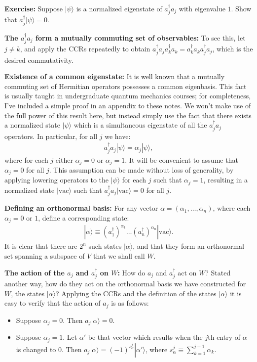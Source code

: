 \documentclass[12pt]{article}
\begin{document}
\textbf{Exercise:} Suppose $|\psi\rangle$ is a normalized eigenstate
of $a_j^\dagger a_j$ with eigenvalue $1$.  Show that $a_j^\dagger
|\psi\rangle = 0$.

\textbf{The $a_j^\dagger a_j$ form a mutually commuting set of
  observables:} To see this, let $j \neq k$, and apply the CCRs
repeatedly to obtain $a_j^\dagger a_j a_k^\dagger a_k = a_k^\dagger
a_k a_j^\dagger a_j$, which is the desired commutativity.

\textbf{Existence of a common eigenstate:} It is well known that a
mutually commuting set of Hermitian operators possesses a common
eigenbasis.  This fact is usually taught in undergraduate quantum
mechanics courses; for completeness, I've included a simple proof in
an appendix to these notes.  We won't make use of the full power of
this result here, but instead simply use the fact that there exists a
normalized state $|\psi\rangle$ which is a simultaneous eigenstate of
all the $a_j^\dagger a_j$ operators.  In particular, for all $j$ we
have:
\begin{eqnarray}
  a_j^\dagger a_j |\psi\rangle = \alpha_j |\psi\rangle,
\end{eqnarray}
where for each $j$ either $\alpha_j = 0$ or $\alpha_j = 1$.  It will
be convenient to assume that $\alpha_j = 0$ for all $j$.  This
assumption can be made without loss of generality, by applying
lowering operators to the $|\psi\rangle$ for each $j$ such that
$\alpha_j = 1$, resulting in a normalized state $|\mbox{vac}\rangle$
such that $a_j^\dagger a_j |\mbox{vac}\rangle = 0$ for all $j$.

\textbf{Defining an orthonormal basis:} For any vector $\alpha =
(\alpha_1,\ldots,\alpha_n)$, where each $\alpha_j = 0$ or $1$, define
a corresponding state:
\begin{eqnarray}
  |\alpha \rangle \equiv (a_1^\dagger)^{\alpha_1} \ldots (a_n^\dagger)^{\alpha_n}|\mbox{vac}\rangle.
\end{eqnarray}
It is clear that there are $2^n$ such states $|\alpha\rangle$, and
that they form an orthonormal set spanning a subspace of $V$ that we
shall call $W$.

\textbf{The action of the $a_j$ and $a_j^\dagger$ on $W$:} How do
$a_j$ and $a_j^\dagger$ act on $W$?  Stated another way, how do they
act on the orthonormal basis we have constructed for $W$, the states
$|\alpha\rangle$?  Applying the CCRs and the definition of the states
$|\alpha\rangle$ it is easy to verify that the action of $a_j$ is as
follows:
\begin{itemize}
\item Suppose $\alpha_j = 0$.  Then $a_j|\alpha\rangle = 0$.
  
\item Suppose $\alpha_j = 1$.  Let $\alpha'$ be that vector which
  results when the $j$th entry of $\alpha$ is changed to $0$.  Then
  $a_j|\alpha\rangle = (-1)^{s_\alpha^j} |\alpha'\rangle$, where
  $s_\alpha^j \equiv \sum_{k=1}^{j-1} \alpha_k$.
\end{itemize}
\end{document}
